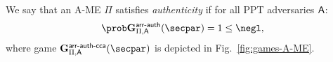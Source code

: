 \begin{definition}[Authenticity of A-ME]\label{def:ame_auth}
    We say that an A-ME $\Pi$ satisfies {\em authenticity} if for all PPT adversaries $\mathsf{A}$:
    \[
        \Prob{\NISHeufgame{\arranged}_{\Pi,\adversary}(\secpar) = 1} \leq \negl,
    \]
    where game $\NISHeufgamecca{\arranged}_{\Pi, \adversary}(\secpar)$ is depicted in Fig.~\ref{fig:games-A-ME}.
\end{definition}